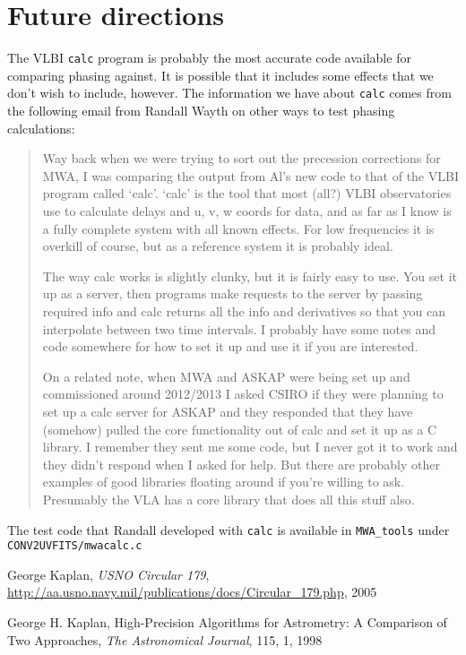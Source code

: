 \documentclass[11pt, oneside]{article}   	%
\begin{document}
\section{Future directions}
The VLBI \texttt{calc} program is probably the most accurate code available for comparing phasing against. It is possible that it  includes some effects that we don't wish to include, however. The information we have about \texttt{calc} comes from the following email from Randall Wayth on other ways to test phasing calculations:
\begin{quotation}
Way back when we were trying to sort out the precession corrections for MWA, I was comparing the output from Al's new code to that of the VLBI program called `calc'. `calc' is the tool that most (all?) VLBI observatories use to calculate delays and u, v, w coords for data, and as far as I know is a fully complete system with all known effects. For low frequencies it is overkill of course, but as a reference system it is probably ideal.

The way calc works is slightly clunky, but it is fairly easy to use. You set it up as a server, then programs make requests to the server by passing required info and calc returns all the info and derivatives so that you can interpolate between two time intervals. I probably have some notes and code somewhere for how to set it up and use it if you are interested.

On a related note, when MWA and ASKAP were being set up and commissioned around 2012/2013 I asked CSIRO if they were planning to set up a calc server for ASKAP and they responded that they have (somehow) pulled the core functionality out of calc and set it up as a C library. I remember they sent me some code, but I never got it to work and they didn't respond when I asked for help. But there are probably other examples of good libraries floating around if you're willing to ask. Presumably the VLA has a core library that does all this stuff also.
\end{quotation}

The test code that Randall developed with \texttt{calc} is available in \verb!MWA_tools! under \verb!CONV2UVFITS/mwacalc.c!

\begin{thebibliography}{9}

  George Kaplan,
  \textit{USNO Circular 179},
  \href{http://aa.usno.navy.mil/publications/docs/Circular_179.php}{\url{http://aa.usno.navy.mil/publications/docs/Circular_179.php}},
  2005
 
  George H. Kaplan, High-Precision Algorithms for Astrometry: A Comparison of Two Approaches,
  \textsl{The Astronomical Journal}, 115, 1, 1998
  \end{thebibliography}
 
 
\end{document}
